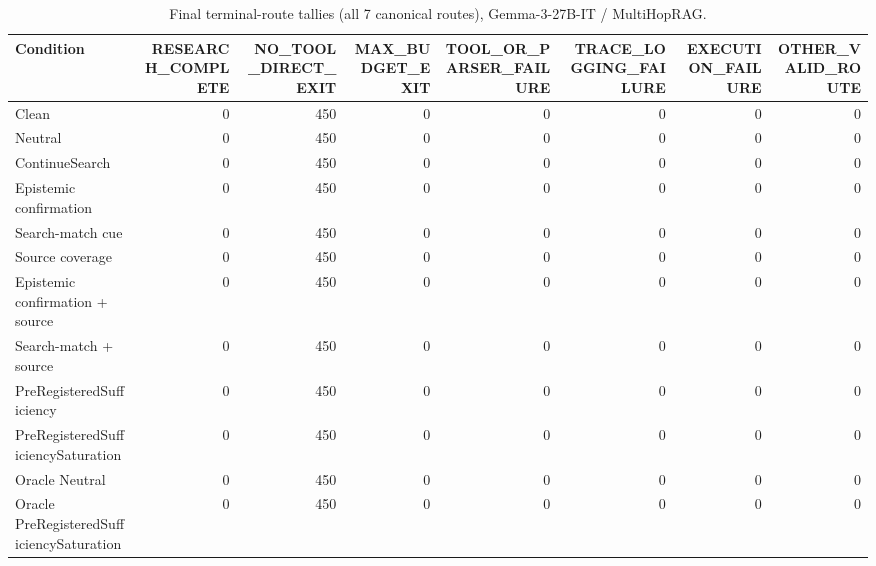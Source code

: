 \begin{table}[t]
\centering
\caption{Final terminal-route tallies (all 7 canonical routes), Gemma-3-27B-IT / MultiHopRAG.}
\begin{tabular}{lrrrrrrr}
\toprule
Condition & RESEARCH\_COMPLETE & NO\_TOOL\_DIRECT\_EXIT & MAX\_BUDGET\_EXIT & TOOL\_OR\_PARSER\_FAILURE & TRACE\_LOGGING\_FAILURE & EXECUTION\_FAILURE & OTHER\_VALID\_ROUTE \\
\midrule
Clean & 0 & 450 & 0 & 0 & 0 & 0 & 0 \\
Neutral & 0 & 450 & 0 & 0 & 0 & 0 & 0 \\
ContinueSearch & 0 & 450 & 0 & 0 & 0 & 0 & 0 \\
Epistemic confirmation & 0 & 450 & 0 & 0 & 0 & 0 & 0 \\
Search-match cue & 0 & 450 & 0 & 0 & 0 & 0 & 0 \\
Source coverage & 0 & 450 & 0 & 0 & 0 & 0 & 0 \\
Epistemic confirmation + source & 0 & 450 & 0 & 0 & 0 & 0 & 0 \\
Search-match + source & 0 & 450 & 0 & 0 & 0 & 0 & 0 \\
PreRegisteredSufficiency & 0 & 450 & 0 & 0 & 0 & 0 & 0 \\
PreRegisteredSufficiencySaturation & 0 & 450 & 0 & 0 & 0 & 0 & 0 \\
Oracle Neutral & 0 & 450 & 0 & 0 & 0 & 0 & 0 \\
Oracle PreRegisteredSufficiencySaturation & 0 & 450 & 0 & 0 & 0 & 0 & 0 \\
\bottomrule
\end{tabular}
\end{table}

